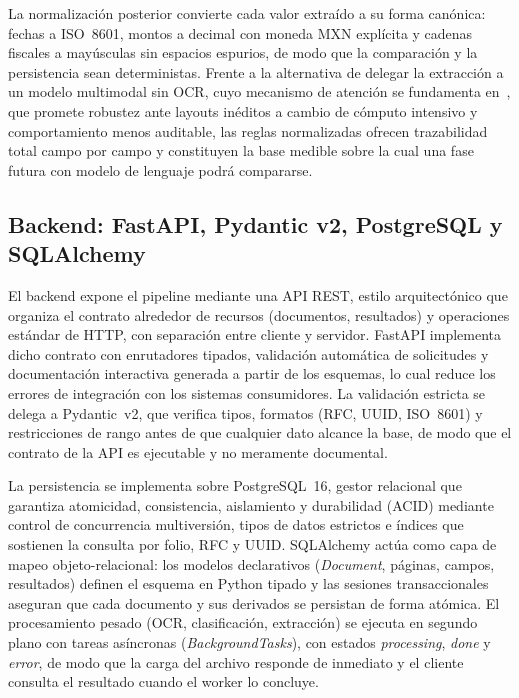La normalización posterior convierte cada valor extraído a su forma canónica: fechas a ISO~8601, montos a decimal con moneda MXN explícita y cadenas fiscales a mayúsculas sin espacios espurios, de modo que la comparación y la persistencia sean deterministas\cite{structured_extraction_2023, pydantic_v2_2024}. Frente a la alternativa de delegar la extracci\'on a un modelo multimodal sin OCR, cuyo mecanismo de atenci\'on se fundamenta en~\cite{vaswani_attention_2017}, que promete robustez ante layouts in\'editos a cambio de c\'omputo intensivo y comportamiento menos auditable, las reglas normalizadas ofrecen trazabilidad total campo por campo y constituyen la base medible sobre la cual una fase futura con modelo de lenguaje podr\'a compararse\cite{kim_donut_2022, structured_extraction_2023}.

\subsection{Backend: FastAPI, Pydantic v2, PostgreSQL y SQLAlchemy} \label{sec:mt_backend}

El backend expone el pipeline mediante una API REST, estilo arquitectónico que organiza el contrato alrededor de recursos (documentos, resultados) y operaciones estándar de HTTP, con separación entre cliente y servidor\cite{fielding_rest_2000}. FastAPI implementa dicho contrato con enrutadores tipados, validación automática de solicitudes y documentación interactiva generada a partir de los esquemas, lo cual reduce los errores de integración con los sistemas consumidores\cite{fastapi_docs}. La validación estricta se delega a Pydantic~v2, que verifica tipos, formatos (RFC, UUID, ISO~8601) y restricciones de rango antes de que cualquier dato alcance la base, de modo que el contrato de la API es ejecutable y no meramente documental\cite{pydantic_v2_2024, fastapi_docs}.

La persistencia se implementa sobre PostgreSQL~16, gestor relacional que garantiza atomicidad, consistencia, aislamiento y durabilidad (ACID) mediante control de concurrencia multiversión, tipos de datos estrictos e índices que sostienen la consulta por folio, RFC y UUID\cite{postgres_docs_2024}. SQLAlchemy actúa como capa de mapeo objeto-relacional: los modelos declarativos (\textit{Document}, páginas, campos, resultados) definen el esquema en Python tipado y las sesiones transaccionales aseguran que cada documento y sus derivados se persistan de forma atómica\cite{sqlalchemy_docs_2024}. El procesamiento pesado (OCR, clasificación, extracción) se ejecuta en segundo plano con tareas asíncronas (\textit{BackgroundTasks}), con estados \textit{processing}, \textit{done} y \textit{error}, de modo que la carga del archivo responde de inmediato y el cliente consulta el resultado cuando el worker lo concluye\cite{fastapi_docs, postgres_docs_2024}.

